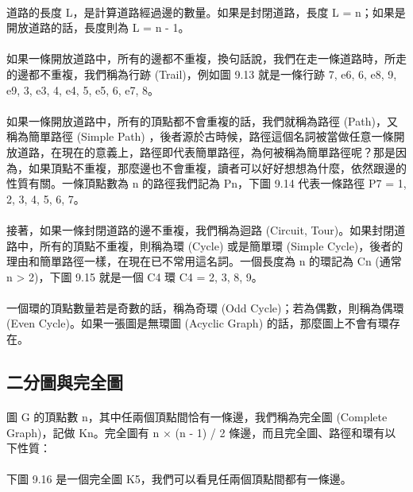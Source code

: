 \documentclass[12pt,a4paper,oneside]{report}
\begin{document}
\begin{CJK}{UTF8}{bkai}
\paragraph{}道路的長度 L，是計算道路經過邊的數量。如果是封閉道路，長度 L = n；如果是開放道路的話，長度則為 L = n - 1。
\paragraph{}如果一條開放道路中，所有的邊都不重複，換句話說，我們在走一條道路時，所走的邊都不重複，我們稱為行跡 (Trail)，例如圖 9.13 就是一條行跡 {7, e6, 6, e8, 9, e9, 3, e3, 4, e4, 5, e5, 6, e7, 8}。
\paragraph{}如果一條開放道路中，所有的頂點都不會重複的話，我們就稱為路徑 (Path)，又稱為簡單路徑 (Simple Path) ，後者源於古時候，路徑這個名詞被當做任意一條開放道路，在現在的意義上，路徑即代表簡單路徑，為何被稱為簡單路徑呢？那是因為，如果頂點不重複，那麼邊也不會重複，讀者可以好好想想為什麼，依然跟邊的性質有關。一條頂點數為 n 的路徑我們記為 Pn，下圖 9.14 代表一條路徑 P7 = {1, 2, 3, 4, 5, 6, 7}。
\paragraph{}接著，如果一條封閉道路的邊不重複，我們稱為迴路 (Circuit, Tour)。如果封閉道路中，所有的頂點不重複，則稱為環 (Cycle) 或是簡單環 (Simple Cycle)，後者的理由和簡單路徑一樣，在現在已不常用這名詞。一個長度為 n 的環記為 Cn (通常 n > 2)，下圖 9.15 就是一個 C4 環 C4 = {2, 3, 8, 9}。
\paragraph{}一個環的頂點數量若是奇數的話，稱為奇環 (Odd Cycle)；若為偶數，則稱為偶環 (Even Cycle)。如果一張圖是無環圖 (Acyclic Graph) 的話，那麼圖上不會有環存在。

\subsection{二分圖與完全圖}
\paragraph{}圖 G 的頂點數 n，其中任兩個頂點間恰有一條邊，我們稱為完全圖 (Complete Graph)，記做 Kn。完全圖有 n × (n - 1) / 2 條邊，而且完全圖、路徑和環有以下性質：
\paragraph{}下圖 9.16 是一個完全圖 K5，我們可以看見任兩個頂點間都有一條邊。

\end{CJK}
\end{document}
